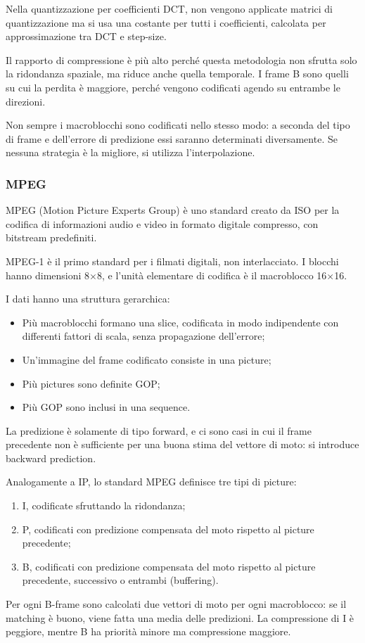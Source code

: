 Nella quantizzazione per coefficienti DCT, non vengono applicate matrici di quantizzazione ma si usa una costante per tutti i coefficienti, calcolata per approssimazione tra DCT e step-size.

Il rapporto di compressione è più alto perché questa metodologia non sfrutta solo la ridondanza spaziale, ma riduce anche quella temporale. I frame B sono quelli su cui la perdita è maggiore, perché vengono codificati agendo su entrambe le direzioni.

Non sempre i macroblocchi sono codificati nello stesso modo: a seconda del tipo di frame e dell'errore di predizione essi saranno determinati diversamente. Se nessuna strategia è la migliore, si utilizza l'interpolazione.

\subsubsection{MPEG}
MPEG (Motion Picture Experts Group) è uno standard creato da ISO per la codifica di informazioni audio e video in formato digitale compresso, con bitstream predefiniti. 

MPEG-1 è il primo standard per i filmati digitali, non interlacciato. I blocchi hanno dimensioni 8$\times$8, e l'unità elementare di codifica è il macroblocco 16$\times$16.

I dati hanno una struttura gerarchica:
\begin{itemize}
	\item Più macroblocchi formano una slice, codificata in modo indipendente con differenti fattori di scala, senza propagazione dell'errore;
	\item Un'immagine del frame codificato consiste in una picture;
	\item Più pictures sono definite GOP;
	\item Più GOP sono inclusi in una sequence.
\end{itemize}

La predizione è solamente di tipo forward, e ci sono casi in cui il frame precedente non è sufficiente per una buona stima del vettore di moto: si introduce backward prediction.

Analogamente a IP, lo standard MPEG definisce tre tipi di picture:
\begin{enumerate}
	\item I, codificate sfruttando la ridondanza;
	\item P, codificati con predizione compensata del moto rispetto al picture precedente;
	\item B, codificati con predizione compensata del moto rispetto al picture precedente, successivo o entrambi (buffering).
\end{enumerate}
Per ogni B-frame sono calcolati due vettori di moto per ogni macroblocco: se il matching è buono, viene fatta una media delle predizioni. La compressione di I è peggiore, mentre B ha priorità minore ma compressione maggiore.

